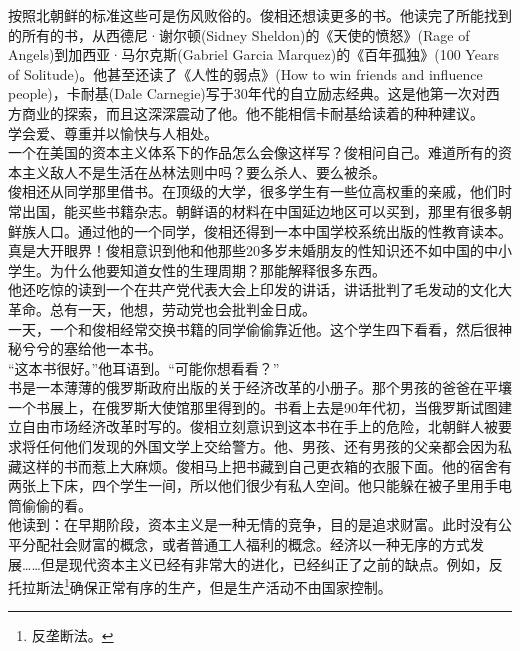 \begin{multicols}{\theparacolNo}
按照北朝鲜的标准这些可是伤风败俗的。俊相还想读更多的书。他读完了所能找到的所有的书，从西德尼·谢尔顿(Sidney Sheldon)的《天使的愤怒》(Rage of Angels)到加西亚·马尔克斯(Gabriel Garcia Marquez)的《百年孤独》(100 Years of Solitude)。他甚至还读了《人性的弱点》(How to win friends and influence people)，卡耐基(Dale Carnegie)写于30年代的自立励志经典。这是他第一次对西方商业的探索，而且这深深震动了他。他不能相信卡耐基给读着的种种建议。\\

学会爱、尊重并以愉快与人相处。\\

一个在美国的资本主义体系下的作品怎么会像这样写？俊相问自己。难道所有的资本主义敌人不是生活在丛林法则中吗？要么杀人、要么被杀。\\

俊相还从同学那里借书。在顶级的大学，很多学生有一些位高权重的亲戚，他们时常出国，能买些书籍杂志。朝鲜语的材料在中国延边地区可以买到，那里有很多朝鲜族人口。通过他的一个同学，俊相还得到一本中国学校系统出版的性教育读本。真是大开眼界！俊相意识到他和他那些20多岁未婚朋友的性知识还不如中国的中小学生。为什么他要知道女性的生理周期？那能解释很多东西。\\

他还吃惊的读到一个在共产党代表大会上印发的讲话，讲话批判了毛发动的文化大革命。总有一天，他想，劳动党也会批判金日成。\\

一天，一个和俊相经常交换书籍的同学偷偷靠近他。这个学生四下看看，然后很神秘兮兮的塞给他一本书。\\

“这本书很好。”他耳语到。“可能你想看看？”\\

书是一本薄薄的俄罗斯政府出版的关于经济改革的小册子。那个男孩的爸爸在平壤一个书展上，在俄罗斯大使馆那里得到的。书看上去是90年代初，当俄罗斯试图建立自由市场经济改革时写的。俊相立刻意识到这本书在手上的危险，北朝鲜人被要求将任何他们发现的外国文学上交给警方。他、男孩、还有男孩的父亲都会因为私藏这样的书而惹上大麻烦。俊相马上把书藏到自己更衣箱的衣服下面。他的宿舍有两张上下床，四个学生一间，所以他们很少有私人空间。他只能躲在被子里用手电筒偷偷的看。\\

他读到：在早期阶段，资本主义是一种无情的竞争，目的是追求财富。此时没有公平分配社会财富的概念，或者普通工人福利的概念。经济以一种无序的方式发展……但是现代资本主义已经有非常大的进化，已经纠正了之前的缺点。例如，反托拉斯法\footnote{反垄断法。}确保正常有序的生产，但是生产活动不由国家控制。\\


\end{multicols}
